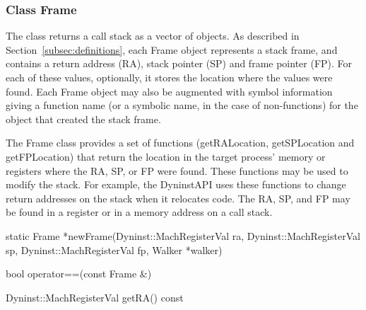 \subsubsection{Class Frame}
\label{subsec:frame}
	
The  class returns a call stack as a vector of  objects. As described
in Section~\ref{subsec:definitions}, each Frame object represents a stack frame, and contains a
return address (RA), stack pointer (SP) and frame pointer (FP). For each of
these values, optionally, it stores the location where the values were found.
Each Frame object may also be augmented with symbol information giving a
function name (or a symbolic name, in the case of non-functions) for the object
that created the stack frame.

The Frame class provides a set of functions (getRALocation, getSPLocation and
getFPLocation) that return the location in the target process' memory or
registers where the RA, SP, or FP were found. These functions may be used to
modify the stack. For example, the DyninstAPI uses these functions to change
return addresses on the stack when it relocates code. The RA, SP, and FP may be
found in a register or in a memory address on a call stack. 

\begin{apient}
static Frame *newFrame(Dyninst::MachRegisterVal ra,
                       Dyninst::MachRegisterVal sp, 
                       Dyninst::MachRegisterVal fp, 
                       Walker *walker)
\end{apient}

\begin{apient}
bool operator==(const Frame &)
\end{apient}


\begin{apient}
Dyninst::MachRegisterVal getRA() const
\end{apient}

